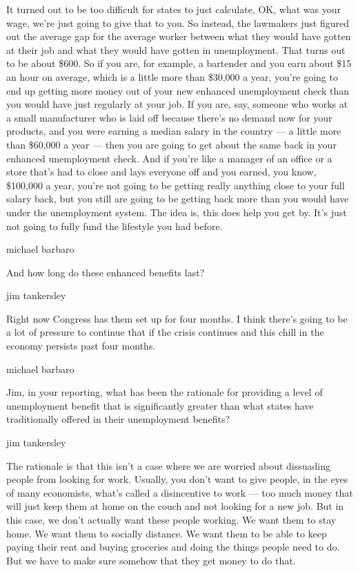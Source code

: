 It turned out to be too difficult for states to just calculate, OK, what
was your wage, we're just going to give that to you. So instead, the
lawmakers just figured out the average gap for the average worker
between what they would have gotten at their job and what they would
have gotten in unemployment. That turns out to be about \$600. So if you
are, for example, a bartender and you earn about \$15 an hour on
average, which is a little more than \$30,000 a year, you're going to
end up getting more money out of your new enhanced unemployment check
than you would have just regularly at your job. If you are, say, someone
who works at a small manufacturer who is laid off because there's no
demand now for your products, and you were earning a median salary in
the country --- a little more than \$60,000 a year --- then you are
going to get about the same back in your enhanced unemployment check.
And if you're like a manager of an office or a store that's had to close
and lays everyone off and you earned, you know, \$100,000 a year, you're
not going to be getting really anything close to your full salary back,
but you still are going to be getting back more than you would have
under the unemployment system. The idea is, this does help you get by.
It's just not going to fully fund the lifestyle you had before.

michael barbaro

And how long do these enhanced benefits last?

jim tankersley

Right now Congress has them set up for four months. I think there's
going to be a lot of pressure to continue that if the crisis continues
and this chill in the economy persists past four months.

michael barbaro

Jim, in your reporting, what has been the rationale for providing a
level of unemployment benefit that is significantly greater than what
states have traditionally offered in their unemployment benefits?

jim tankersley

The rationale is that this isn't a case where we are worried about
dissuading people from looking for work. Usually, you don't want to give
people, in the eyes of many economists, what's called a disincentive to
work --- too much money that will just keep them at home on the couch
and not looking for a new job. But in this case, we don't actually want
these people working. We want them to stay home. We want them to
socially distance. We want them to be able to keep paying their rent and
buying groceries and doing the things people need to do. But we have to
make sure somehow that they get money to do that.

